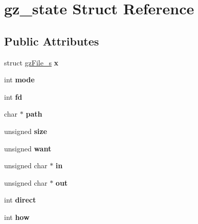 \hypertarget{structgz__state}{}\section{gz\+\_\+state Struct Reference}
\label{structgz__state}
\subsection*{Public Attributes}
\begin{DoxyCompactItemize}
\item 
\mbox{\label{structgz__state_a92b9a7b77e0b6a494275d8bf0f0f3274}} 
struct \hyperlink{structgz_file__s}{gz\+File\+\_\+s} {\bfseries x}
\item 
\mbox{\label{structgz__state_aaded3d8b2702b1bfabe3141e6f772b1a}} 
int {\bfseries mode}
\item 
\mbox{\label{structgz__state_a5963abca9e640ff2aa40b517f9cffc2c}} 
int {\bfseries fd}
\item 
\mbox{\label{structgz__state_ae80c08b32718cb553d755652008da859}} 
char $\ast$ {\bfseries path}
\item 
\mbox{\label{structgz__state_a36b86ed64aca8f022ec0f3411663fe24}} 
unsigned {\bfseries size}
\item 
\mbox{\label{structgz__state_abee992fb115f9f118377b9f46d14b2a5}} 
unsigned {\bfseries want}
\item 
\mbox{\label{structgz__state_ae907e56872be78a140f2c07e9796898d}} 
unsigned char $\ast$ {\bfseries in}
\item 
\mbox{\label{structgz__state_ae08963e6f54d0c1a8ba311f14f3cf941}} 
unsigned char $\ast$ {\bfseries out}
\item 
\mbox{\label{structgz__state_a114c6a0de43039853ead48a092792a7d}} 
int {\bfseries direct}
\item 
\mbox{\label{structgz__state_ac6e4b7db699aacd089f6d55b01483d6f}} 
int {\bfseries how}

\end{DoxyCompactItemize}
